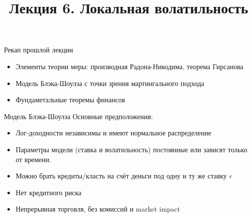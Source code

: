 \documentclass[aspectratio=169]{beamer}
\title[Модели стохастической волатильности]{Лекция 6. Локальная волатильность} %
\begin{document}
\begin{frame}
\titlepage 
\end{frame}

\begin{frame}{Рекап прошлой лекции}
    \begin{itemize}
        \item Элементы теории меры: производная Радона-Никодима, теорема Гирсанова
        \item Модель Блэка-Шоулза с точки зрения мартингального подхода
        \item Фундаметальные теоремы финансов
    \end{itemize}
\end{frame}

\begin{frame}{Модель Блэка-Шоулза}
    Основные предположения:
    \begin{itemize}
        \item Лог-доходности независимы и имеют нормальное распределение
        \item Параметры модели (ставка и волатильность) постоянные или зависят только от времени.
        \item Можно брать кредиты/класть на счёт деньги под одну и ту же ставку $r$
        \item Нет кредитного риска
        \item Непрерывная торговля, без комиссий и market impact
    \end{itemize}
\end{frame}
\end{document}

